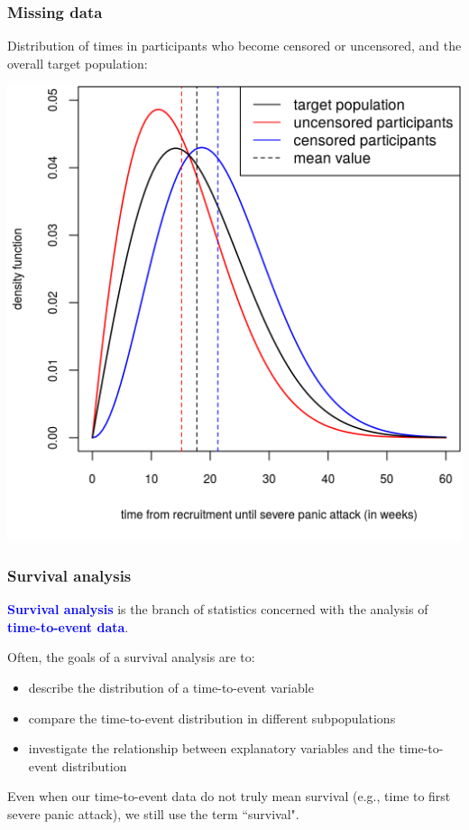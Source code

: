 \documentclass[10pt,t]{beamer}
\begin{document}
\begin{frame}
\frametitle{Missing data}

\vspace{-7 mm}

Distribution of times in participants who become censored or uncensored, and the overall target population:
\begin{center}
\includegraphics[height=\textheight]{figs/meditation_density_versus_obs_time.png}
\end{center}
\end{frame}

\begin{frame}
\frametitle{Survival analysis}
\textcolor{blue}{\textbf{Survival analysis}} is the branch of statistics concerned with the analysis of \textcolor{blue}{\textbf{time-to-event data}}.

\vspace{0.3cm}

Often, the goals of a survival analysis are to:
\medskip

\begin{itemize}
\item describe the distribution of a time-to-event variable

\medskip

\item compare the time-to-event distribution in different subpopulations

\medskip

\item investigate the relationship between explanatory variables and the time-to-event distribution
\end{itemize}

\vspace{0.3cm}

Even when our time-to-event data do not truly mean survival (e.g., time to first severe panic attack), we still use the term ``survival". 
\end{frame}
\end{document}
